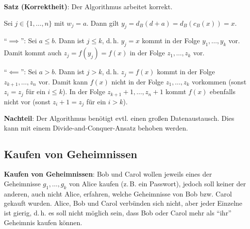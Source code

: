 \linie

\textbf{Satz (Korrektheit)}:
Der Algorithmus arbeitet korrekt.

\begin{Beweis}
    Sei $j \in \{1, \dotsc, n\}$ mit $w_j = a$.
    Dann gilt $y_j = d_B(d + a) = d_B(c_B(x)) = x$.
    
    "`$\implies$"':
    Sei $a \le b$.
    Dann ist $j \le k$, d.\,h. $y_j = x$ kommt in der Folge $y_1, \dotsc, y_k$ vor.
    Damit kommt auch $z_j = f(y_j) = f(x)$ in der Folge $z_1, \dotsc, z_k$ vor.
    
    "`$\impliedby$"':
    Sei $a > b$.
    Dann ist $j > k$, d.\,h. $z_j = f(x)$ kommt in der Folge $z_{k+1}, \dotsc, z_n$ vor.
    Damit kann $f(x)$ nicht in der Folge $z_1, \dotsc, z_k$ vorkommen
    (sonst $z_i = z_j$ für ein $i \le k$).
    In der Folge $z_{k+1} + 1, \dotsc, z_n + 1$ kommt $f(x)$ ebenfalls nicht vor
    (sonst $z_i + 1 = z_j$ für ein $i > k$).
\end{Beweis}

\linie

\textbf{Nachteil}:
Der Algorithmus benötigt evtl. einen großen Datenaustausch.
Dies kann mit einem Divide-and-Conquer-Ansatz behoben werden.

\pagebreak

\subsection{%
    Kaufen von Geheimnissen%
}

\textbf{Kaufen von Geheimnissen}:
Bob und Carol wollen jeweils eines der Geheimnisse $g_1, \dotsc, g_k$ von Alice kaufen
(z.\,B. ein Passwort),
jedoch soll keiner der anderen, auch nicht Alice, erfahren, welche Geheimnisse von
Bob bzw. Carol gekauft wurden.
Alice, Bob und Carol verbünden sich nicht,
aber jeder Einzelne ist gierig, d.\,h. es soll nicht möglich sein, dass Bob oder Carol mehr
als "`ihr"' Geheimnis kaufen können.

